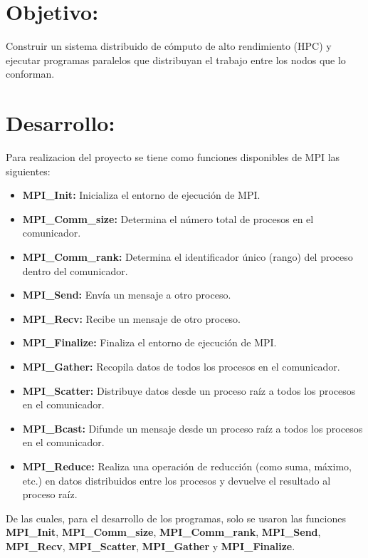 \documentclass[letterpaper,11pt]{article}
\begin{document}
    

    \newpage
    {\hypersetup{linkcolor=black}\tableofcontents}
    
    \newpage

    \setcounter{page}{1}

    \section{Objetivo:}

    Construir un sistema distribuido de cómputo de alto rendimiento (HPC) y ejecutar programas paralelos que distribuyan el trabajo entre los nodos que lo conforman.

    \section{Desarrollo:}
    Para realizacion del proyecto se tiene como funciones disponibles de MPI las siguientes:
    \begin{itemize}
        \item \textbf{MPI\_Init:} Inicializa el entorno de ejecución de MPI.
        \item \textbf{MPI\_Comm\_size:} Determina el número total de procesos en el comunicador.
        \item \textbf{MPI\_Comm\_rank:} Determina el identificador único (rango) del proceso dentro del comunicador.
        \item \textbf{MPI\_Send:} Envía un mensaje a otro proceso.
        \item \textbf{MPI\_Recv:} Recibe un mensaje de otro proceso.
        \item \textbf{MPI\_Finalize:} Finaliza el entorno de ejecución de MPI.
        \item \textbf{MPI\_Gather:} Recopila datos de todos los procesos en el comunicador.
        \item \textbf{MPI\_Scatter:} Distribuye datos desde un proceso raíz a todos los procesos en el comunicador.
        \item \textbf{MPI\_Bcast:} Difunde un mensaje desde un proceso raíz a todos los procesos en el comunicador.
        \item \textbf{MPI\_Reduce:} Realiza una operación de reducción (como suma, máximo, etc.) en datos distribuidos entre los procesos y devuelve el resultado al proceso raíz.
    \end{itemize}

    De las cuales, para el desarrollo de los programas, solo se usaron las funciones \textbf{MPI\_Init}, \textbf{MPI\_Comm\_size}, \textbf{MPI\_Comm\_rank}, \textbf{MPI\_Send}, \textbf{MPI\_Recv}, \textbf{MPI\_Scatter}, \textbf{MPI\_Gather} y \textbf{MPI\_Finalize}.
\end{document}
